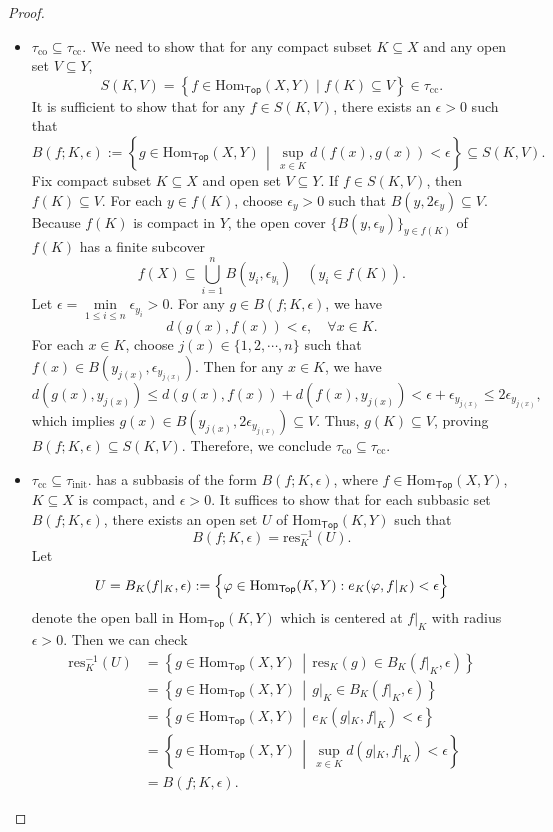 \documentclass{report}
\newcommand{\midv}{\,\middle\vert\,}
\begin{document}
\begin{proof}
	\begin{itemize}
		\item $\tau_{\mathrm{co}}\subseteq \tau_{\mathrm{cc}}$. We need to show that for any compact subset $K\subseteq X$ and any open set $V\subseteq Y$, 
		\[	
		S(K,V)=\left\{f\in \mathrm{Hom}_{\mathsf{Top}}(X,Y)\mid f(K)\subseteq V\right\} \in \tau_{\mathrm{cc}}.
		\]
        It is sufficient to show that for any $f\in S(K,V)$, there exists an $\epsilon>0$ such that 
		\[
		B(f;K,\epsilon):=\left\{ g\in \mathrm{Hom}_{\mathsf{Top}}(X,Y)\midv \sup_{x\in K}d\left(f(x),g(x)\right)<\epsilon \right\} \subseteq S(K,V).
		\]
		Fix compact subset $K\subseteq X$ and open set $V\subseteq Y$. If $f\in S(K,V)$, then $f(K)\subseteq V$. For each $y\in f(K)$, choose $\epsilon_y>0$ such that $B(y,2 \epsilon_y)\subseteq V$. Because $f(K)$ is compact in $Y$, the open cover $\{B(y, \epsilon_y)\}_{y \in f(K)}$ of $f(K)$ has a finite subcover
		$$
		f(X) \subseteq \bigcup_{i=1}^n B\left(y_i, \epsilon_{y_i}\right) \quad\left(y_i \in f(K)\right).
		$$
		Let $\epsilon=\min\limits_{1\le i\le n}\epsilon_{y_i}>0$. For any $g\in B(f;K,\epsilon)$, we have
		\[
		d(g(x),f(x))<\epsilon,\quad\forall x \in K.
		\]
		 For each $x\in K$, choose $j(x)\in \{1,2,\cdots,n\}$ such that $f(x)\in B(y_{j(x)},\epsilon_{y_{j(x)}})$. Then for any $x\in K$, we have
		$$
		d\left(g(x),y_{j(x)}\right)\le d(g(x), f(x))+ d\left(f(x), y_{j(x)}\right)<\epsilon+\epsilon_{y_{j(x)}}\le 2\epsilon_{y_{j(x)}},
		$$
		which implies $g(x)\in B\left(y_{j(x)}, 2\epsilon_{y_{j(x)}}\right)\subseteq V$. Thus, $g(K)\subseteq V$, proving $B(f;K,\epsilon)\subseteq S(K,V)$. Therefore, we conclude $\tau_{\mathrm{co}}\subseteq \tau_{\mathrm{cc}}$.
		\item $\tau_{\mathrm{cc}}\subseteq \tau_{\mathrm{init}}$. has a subbasis of the form $B(f;K,\epsilon)$, where $f\in \mathrm{Hom}_{\mathsf{Top}}(X,Y)$, $K\subseteq X$ is compact, and $\epsilon>0$. It suffices to show that for each subbasic set $B(f;K,\epsilon)$, there exists an open set $U$ of $\mathrm{Hom}_{\mathsf{Top}}(K,Y)$ such that 
		$$
           B(f;K,\epsilon)=\mathrm{res}_K^{-1}\left(U\right).
		$$
		Let
		\[
		U=B_K(f|_K,\epsilon):=\Bigl\{\varphi\in \mathrm{Hom}_{\mathsf{Top}}(K,Y): e_K(\varphi,f|_K)<\epsilon\Bigr\}
		\]
		denote the open ball in $\mathrm{Hom}_{\mathsf{Top}}(K,Y)$ which is centered at $f|_K$ with radius $\epsilon>0$. Then we can check
		\begin{align*}
			\mathrm{res}_K^{-1}\left(U\right)&=\left\{g\in \mathrm{Hom}_{\mathsf{Top}}(X,Y)\midv \mathrm{res}_K(g)\in B_K(f|_K,\epsilon)\right\}\\
			&=\left\{g\in \mathrm{Hom}_{\mathsf{Top}}(X,Y)\midv g|_K\in B_K(f|_K,\epsilon)\right\}\\
			&=\left\{g\in \mathrm{Hom}_{\mathsf{Top}}(X,Y)\midv e_K(g|_K,f|_K)<\epsilon\right\}\\
			&=\left\{g\in \mathrm{Hom}_{\mathsf{Top}}(X,Y)\midv \sup_{x\in K}d\left(g|_K,f|_K\right)<\epsilon\right\}\\
			&=B(f;K,\epsilon).
		\end{align*}
		
	\end{itemize}
\end{proof}
\end{document}
